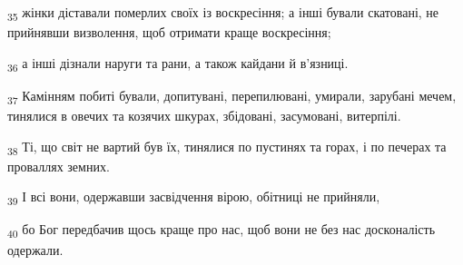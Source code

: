 \begin{tcolorbox}
\textsubscript{35} жінки діставали померлих своїх із воскресіння; а інші бували скатовані, не прийнявши визволення, щоб отримати краще воскресіння;
\end{tcolorbox}
\begin{tcolorbox}
\textsubscript{36} а інші дізнали наруги та рани, а також кайдани й в'язниці.
\end{tcolorbox}
\begin{tcolorbox}
\textsubscript{37} Камінням побиті бували, допитувані, перепилювані, умирали, зарубані мечем, тинялися в овечих та козячих шкурах, збідовані, засумовані, витерпілі.
\end{tcolorbox}
\begin{tcolorbox}
\textsubscript{38} Ті, що світ не вартий був їх, тинялися по пустинях та горах, і по печерах та проваллях земних.
\end{tcolorbox}
\begin{tcolorbox}
\textsubscript{39} І всі вони, одержавши засвідчення вірою, обітниці не прийняли,
\end{tcolorbox}
\begin{tcolorbox}
\textsubscript{40} бо Бог передбачив щось краще про нас, щоб вони не без нас досконалість одержали.
\end{tcolorbox}
